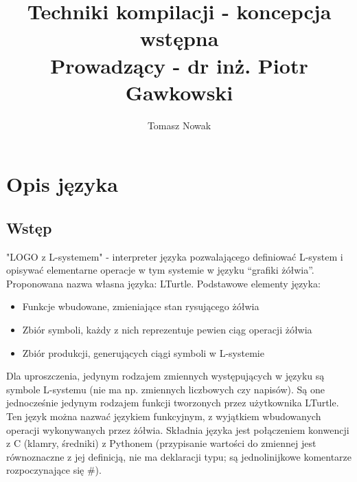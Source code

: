 \documentclass{article}
\title{%
  Techniki kompilacji - koncepcja wstępna \\
  \large Prowadzący - dr inż. Piotr Gawkowski
}
\author{Tomasz Nowak}
\date{}
\begin{document}
\maketitle


\section{Opis języka}

\subsection{Wstęp}
"LOGO z L-systemem" - interpreter języka pozwalającego definiować L-system i opisywać elementarne operacje w tym systemie w języku “grafiki żółwia”.
Proponowana nazwa własna języka: LTurtle. \newline{}
Podstawowe elementy języka:
\begin{itemize}
    \item{Funkcje wbudowane, zmieniające stan rysującego żółwia}
    \item{Zbiór symboli, każdy z nich reprezentuje pewien ciąg operacji żółwia}
    \item{Zbiór produkcji, generujących ciągi symboli w L-systemie}
\end{itemize}
Dla uproszczenia, jedynym rodzajem zmiennych występujących w języku są symbole L-systemu (nie ma np. zmiennych liczbowych czy napisów). Są one jednocześnie jedynym rodzajem funkcji tworzonych przez użytkownika  LTurtle. Ten język można nazwać językiem funkcyjnym, z wyjątkiem wbudowanych operacji wykonywanych przez żółwia. Składnia języka jest połączeniem konwencji z C (klamry, średniki) z Pythonem (przypisanie wartości do zmiennej jest równoznaczne z jej definicją, nie ma deklaracji typu; są jednolinijkowe komentarze rozpoczynające się \#).
\end{document}

